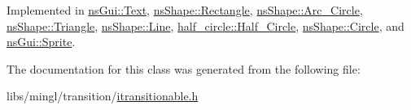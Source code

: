 Implemented in \hyperlink{classns_gui_1_1_text_ac1145b3ef4722b7cc9ae111372b84576}{ns\+Gui\+::\+Text}, \hyperlink{classns_shape_1_1_rectangle_a9fcdc9a8adbc91cd2613a0d50058f829}{ns\+Shape\+::\+Rectangle}, \hyperlink{classns_shape_1_1_arc___circle_aa59b45d2a10ec5f8fd030d4ec46721b6}{ns\+Shape\+::\+Arc\+\_\+\+Circle}, \hyperlink{classns_shape_1_1_triangle_af1c6cb0d5d12d8df0bd66c46ec793b22}{ns\+Shape\+::\+Triangle}, \hyperlink{classns_shape_1_1_line_a9984a9a1e69256065de1bd0cc51d2e8f}{ns\+Shape\+::\+Line}, \hyperlink{classhalf__circle_1_1_half___circle_ab128d56c2d348524d88da23b89bf3d35}{half\+\_\+circle\+::\+Half\+\_\+\+Circle}, \hyperlink{classns_shape_1_1_circle_a3edfd0468ef78f456c4fc4fd57c84cdf}{ns\+Shape\+::\+Circle}, and \hyperlink{classns_gui_1_1_sprite_a4259e3283228980136e06d2a41a75d31}{ns\+Gui\+::\+Sprite}.



The documentation for this class was generated from the following file\+:\begin{DoxyCompactItemize}
\item 
libs/mingl/transition/\hyperlink{itransitionable_8h}{itransitionable.\+h}\end{DoxyCompactItemize}
